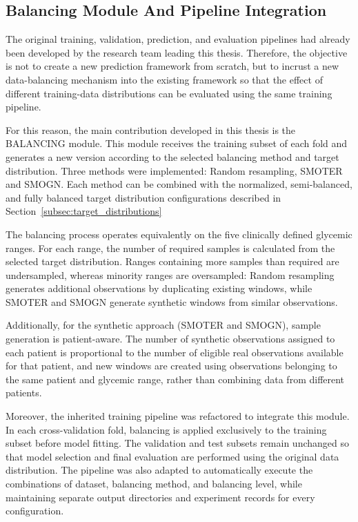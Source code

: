 \subsection{Balancing Module And Pipeline Integration}
\label{subsec:balancing_implementation}

The original training, validation, prediction, and evaluation pipelines had already been developed by the research team leading this thesis. Therefore, the objective is not to create a new prediction framework from scratch, but to incrust a new data-balancing mechanism into the existing framework so that the effect of different training-data distributions can be evaluated using the same training pipeline.

For this reason, the main contribution developed in this thesis is the BALANCING module. This module receives the training subset of each fold and generates a new version according to the selected balancing method and target distribution. Three methods were implemented: Random resampling, SMOTER and SMOGN. Each method can be combined with the normalized, semi-balanced, and fully balanced target distribution configurations described in Section~\ref{subsec:target_distributions}

The balancing process operates equivalently on the five clinically defined glycemic ranges. For each range, the number of required samples is calculated from the selected target distribution. Ranges containing more samples than required are undersampled, whereas minority ranges are oversampled: Random resampling generates additional observations by duplicating existing windows, while SMOTER and SMOGN generate synthetic windows from similar observations.

Additionally, for the synthetic approach (SMOTER and SMOGN), sample generation is patient-aware. The number of synthetic observations assigned to each patient is proportional to the number of eligible real observations available for that patient, and new windows are created using observations belonging to the same patient and glycemic range, rather than combining data from different patients.

Moreover, the inherited training pipeline was refactored to integrate this module. In each cross-validation fold, balancing is applied exclusively to the training subset before model fitting. The validation and test subsets remain unchanged so that model selection and final evaluation are performed using the original data distribution. The pipeline was also adapted to automatically execute the combinations of dataset, balancing method, and balancing level, while maintaining separate output directories and experiment records for every configuration.

